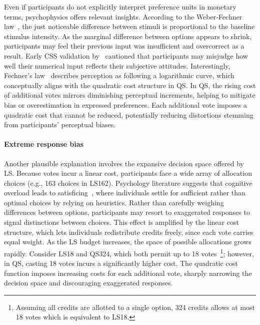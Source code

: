 Even if participants do not explicitly interpret preference units in monetary terms, psychophysics offers relevant insights. According to the Weber-Fechner law~\cite{dehaeneNeuralBasisWeber2003, kruegerReconcilingFechnerStevens1989}, the just noticeable difference between stimuli is proportional to the baseline stimulus intensity. As the marginal difference between options appears to shrink, participants may feel their previous input was insufficient and overcorrect as a result. Early CSS validation by~\citet{dudekValidityPointAssignmentProcedure1957} cautioned that participants may misjudge how well their numerical input reflects their subjective attitudes. Interestingly, Fechner's law~\cite{kruegerReconcilingFechnerStevens1989} describes perception as following a logarithmic curve, which conceptually aligns with the quadratic cost structure in QS. In QS, the rising cost of additional votes mirrors diminishing perceptual increments, helping to mitigate bias or overestimation in expressed preferences. Each additional vote imposes a quadratic cost that cannot be reduced, potentially reducing distortions stemming from participants' perceptual biases.

\paragraph{Extreme response bias}
Another plausible explanation involves the expansive decision space offered by LS. Because votes incur a linear cost, participants face a wide array of allocation choices (e.g., 163 choices in LS162). Psychology literature suggests that cognitive overload leads to satisficing~\cite{schwartzMaximizingSatisficingHappiness2002, iyengarWhenChoiceDemotivating2000}, where individuals settle for sufficient rather than optimal choices by relying on heuristics. Rather than carefully weighing differences between options, participants may resort to exaggerated responses to signal distinctions between choices. This effect is amplified by the linear cost structure, which lets individuals redistribute credits freely, since each vote carries equal weight. As the LS budget increases, the space of possible allocations grows rapidly. Consider LS18 and QS324, which both permit up to 18 votes~\footnote{Assuming all credits are allotted to a single option, 324 credits allows at most 18 votes which is equivalent to LS18.}; however, in QS, casting 18 votes incurs a significantly higher cost. The quadratic cost function imposes increasing costs for each additional vote, sharply narrowing the decision space and discouraging exaggerated responses.

